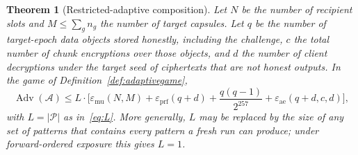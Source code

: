 \documentclass[pdflatex,sn-mathphys-num]{sn-jnl}
\theoremstyle{plain}
\newtheorem{theorem}{Theorem}
\theoremstyle{definition}
\newcommand{\Adv}{\operatorname{Adv}}
\begin{document}
\begin{theorem}[Restricted-adaptive composition]\label{thm:adaptive}
Let $N$ be the number of recipient slots and $M\le\sum_gn_g$ the number of target capsules. Let $q$ be the number of target-epoch data objects stored honestly, including the challenge, $c$ the total number of chunk encryptions over those objects, and $d$ the number of client decryptions under the target seed of ciphertexts that are not honest outputs. In the game of Definition~\ref{def:adaptivegame},
\begin{equation}\label{eq:adaptive}
 \Adv(\mathcal A)\le L\cdot\Big[\varepsilon_{\mathrm{mu}}(N,M)+\varepsilon_{\mathrm{prf}}(q+d)+\frac{q(q-1)}{2^{257}}+\varepsilon_{\mathrm{ae}}(q+d,c,d)\Big],
\end{equation}
with $L=|\mathcal P|$ as in~\eqref{eq:L}. More generally, $L$ may be replaced by the size of any set of patterns that contains every pattern a fresh run can produce; under forward-ordered exposure this gives $L=1$.
\end{theorem}
\end{document}
